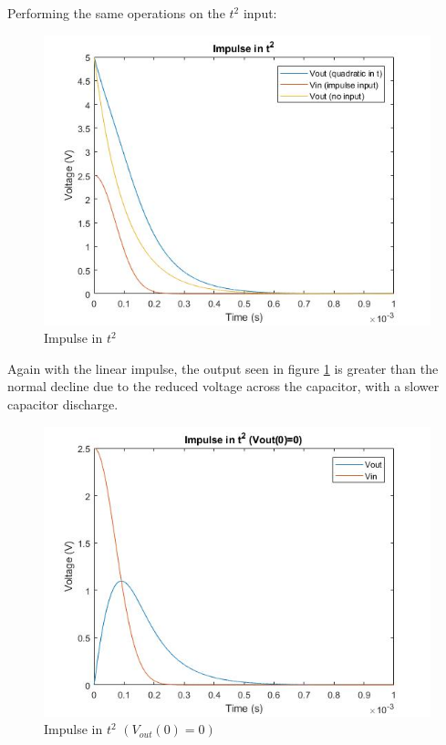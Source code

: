 \documentclass[11pt, oneside, titlepage]{article}   	%
\begin{document}
Performing the same operations on the $t^2$ input:

\begin{figure}[H]
\center
\includegraphics[scale = 0.5]{exercise1_8}
\caption{Impulse in $t^2$} \label{fig:ex1_8}
\end{figure}

Again with the linear impulse, the output seen in figure \ref{fig:ex1_8} is greater than the normal decline due to the reduced voltage across the capacitor, with a slower capacitor discharge.

\begin{figure}[H]
\center
\includegraphics[scale = 0.5]{exercise1_9}
\caption{Impulse in $t^2$ $(V_{out}(0) = 0)$} \label{fig:ex1_9}
\end{figure}
\end{document}

